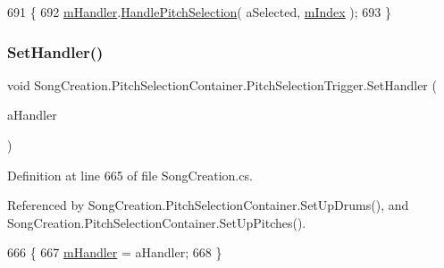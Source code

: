 \begin{DoxyCode}
691             \{
692                 \hyperlink{class_song_creation_1_1_pitch_selection_container_1_1_pitch_selection_trigger_aad92d071482ccc179c9a40cada09785b}{mHandler}.\hyperlink{class_song_creation_1_1_pitch_selection_container_ac87a7591bbd41276ff2ea28b7698b30c}{HandlePitchSelection}( aSelected, 
      \hyperlink{class_song_creation_1_1_pitch_selection_container_1_1_pitch_selection_trigger_a6fa7a0883292035fef62858a69044010}{mIndex} );
693             \}
\end{DoxyCode}
\mbox{\label{class_song_creation_1_1_pitch_selection_container_1_1_pitch_selection_trigger_a963bc1a13bdd44643cf814aa4976f3d0}} 
\subsubsection{\texorpdfstring{Set\+Handler()}{SetHandler()}}
{\footnotesize\ttfamily void Song\+Creation.\+Pitch\+Selection\+Container.\+Pitch\+Selection\+Trigger.\+Set\+Handler (\begin{DoxyParamCaption}\item[{\hyperlink{class_song_creation_1_1_pitch_selection_container}{Pitch\+Selection\+Container}}]{a\+Handler }\end{DoxyParamCaption})}



Definition at line 665 of file Song\+Creation.\+cs.



Referenced by Song\+Creation.\+Pitch\+Selection\+Container.\+Set\+Up\+Drums(), and Song\+Creation.\+Pitch\+Selection\+Container.\+Set\+Up\+Pitches().


\begin{DoxyCode}
666             \{
667                 \hyperlink{class_song_creation_1_1_pitch_selection_container_1_1_pitch_selection_trigger_aad92d071482ccc179c9a40cada09785b}{mHandler} = aHandler;
668             \}
\end{DoxyCode}
\mbox{\label{class_song_creation_1_1_pitch_selection_container_1_1_pitch_selection_trigger_a1f01d4d64cc4697b0c403c007a014afa}} 
